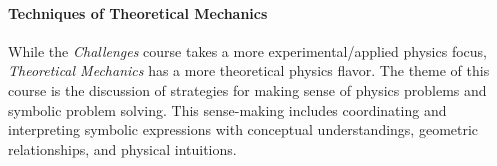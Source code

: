 \documentclass[english,aps,pra,reprint,noshowpacs,superscriptaddress]{revtex4-1}
\begin{document}



\paragraph{Techniques of Theoretical Mechanics}

While the \emph{Challenges} course takes a more experimental/applied physics
focus, \emph{Theoretical Mechanics} has a more
theoretical physics flavor. The theme of this course is the discussion
of strategies for making sense of physics problems and symbolic
problem solving. This sense-making includes coordinating and
interpreting symbolic expressions with conceptual understandings,
geometric relationships, and physical intuitions.
\end{document}
